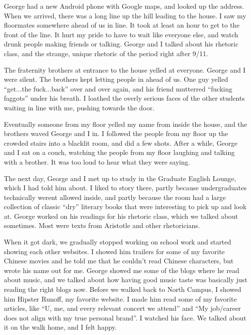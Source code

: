 George had a new Android phone with Google maps, and looked up the address.
When we arrived, there was a long line up the hill leading to the house.  I saw
my floormates somewhere ahead of us in line.  It took at least an hour to get
to the front of the line.  It hurt my pride to have to wait like everyone else,
and watch drunk people making friends or talking.  George and I talked about
his rhetoric class, and the strange, unique rhetoric of the period right after
9/11.
 
The fraternity brothers at entrance to the house yelled at everyone.  George and
I were silent.  The brothers kept letting people in ahead of us.  One guy yelled
``get...the fuck...back'' over and over again, and his friend mutterred
``fucking faggots'' under his breath.  I loathed the overly serious faces of the
other students waiting in line with me, pushing towards the door.

Eventually someone from my floor yelled my name from inside the house, and the
brothers waved George and I in.  I followed the people from my floor up the
crowded stairs into a blacklit room, and did a few shots.  After a while, George
and I sat on a couch, watching the people from my floor laughing and talking
with a brother.  It was too loud to hear what they were saying.

The next day, George and I met up to study in the Graduate English Lounge, which
I had told him about.  I liked to story there, partly because undergraduates
technically werent allowed inside, and partly because the room had a large
collection of classic ``dry'' literary books that were interesting to pick up
and look at.  George worked on his readings for his rhetoric class, which we
talked about sometimes.   Most were texts from Aristotle and other rhetoricians. 

When it got dark, we gradually stopped working on school work and started
showing each other websites.  I showed him trailers for some of my favorite
Chinese movies and he told me that he couldn't read Chinese characters, but
wrote his name out for me.  George showed me some of the blogs where he read
about music, and we talked about how having good music taste was basically just
reading the right blogs now.  Before we walked back to North Campus, I showed
him Hipster Runoff, my favorite website.  I made him read some of my favorite
articles, like ``U, me, and every relevant concert we attend'' and ``My
job/career does not align with my true personal brand''.  I watched his face.
We talked about it on the walk home, and I felt happy.

